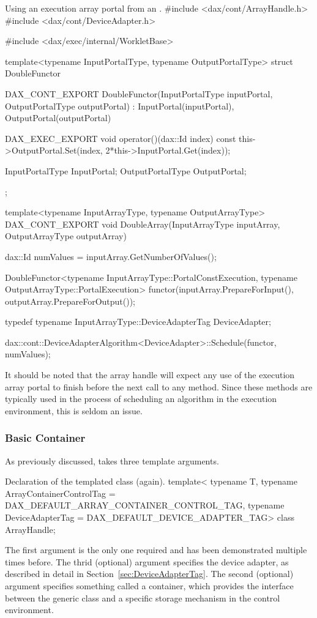 \begin{daxexample}{Using an execution array portal from an .}
#include <dax/cont/ArrayHandle.h>
#include <dax/cont/DeviceAdapter.h>

#include <dax/exec/internal/WorkletBase>

template<typename InputPortalType, typename OutputPortalType>
struct DoubleFunctor
{
  DAX_CONT_EXPORT
  DoubleFunctor(InputPortalType inputPortal, OutputPortalType outputPortal)
    : InputPortal(inputPortal), OutputPortal(outputPortal) {  }

  DAX_EXEC_EXPORT
  void operator()(dax::Id index) const {
    this->OutputPortal.Set(index, 2*this->InputPortal.Get(index));
  }

  InputPortalType InputPortal;
  OutputPortalType OutputPortal;
};

template<typename InputArrayType, typename OutputArrayType>
DAX_CONT_EXPORT
void DoubleArray(InputArrayType inputArray, OutputArrayType outputArray)
{
  dax::Id numValues = inputArray.GetNumberOfValues();

  DoubleFunctor<typename InputArrayType::PortalConstExecution,
                typename OutputArrayType::PortalExecution>
    functor(inputArray.PrepareForInput(),
            outputArray.PrepareForOutput());

  typedef typename InputArrayType::DeviceAdapterTag DeviceAdapter;

  dax::cont::DeviceAdapterAlgorithm<DeviceAdapter>::Schedule(functor, numValues);
}
\end{daxexample}

It should be noted that the array handle will expect any use of the
execution array portal to finish before the next call to any
 method. Since these  methods
are typically used in the process of scheduling an algorithm in the
execution environment, this is seldom an issue.

\subsubsection{Basic Container}


As previously discussed,  takes three template
arguments.
\begin{daxexample}{Declaration of the \protect{} templated class (again).}
template<
    typename T,
    typename ArrayContainerControlTag = DAX_DEFAULT_ARRAY_CONTAINER_CONTROL_TAG,
    typename DeviceAdapterTag = DAX_DEFAULT_DEVICE_ADAPTER_TAG>
class ArrayHandle;
\end{daxexample}
The first argument is the only one required and has been demonstrated
multiple times before. The thrid (optional) argument specifies the device
adapter, as described in detail in Section~\ref{sec:DeviceAdapterTag}. The
second (optional) argument specifies something called a container, which
provides the interface between the generic  class and
a specific storage mechanism in the control environment.


